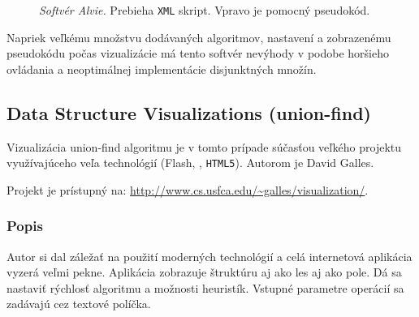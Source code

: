 \begin{figure}
\centering
{}
\caption{\emph{Softvér Alvie.} Prebieha {\tt XML} skript. Vpravo je pomocný 
pseudokód.}
\label{img:vis:alvie}
\end{figure}

Napriek veľkému množstvu dodávaných algoritmov, nastavení a 
zobrazenému pseudokódu počas vizualizácie má tento softvér nevýhody v podobe 
horšieho ovládania a neoptimálnej implementácie disjunktných množín.

\subsection{Data Structure Visualizations (union-find)}\label{sec:galles}

Vizualizácia union-find algoritmu je v tomto prípade súčasťou veľkého projektu 
využívajúceho veľa technológií (Flash, \Java, {\tt HTML5}). Autorom je David 
Galles.

Projekt je prístupný na: 
\hbox{\url{http://www.cs.usfca.edu/~galles/visualization/}}.

\subsubsection{Popis}

Autor si dal záležať na použití moderných technológií a celá internetová 
aplikácia vyzerá veľmi pekne. Aplikácia zobrazuje štruktúru aj ako les aj ako 
pole. Dá sa nastaviť rýchlosť algoritmu a možnosti heuristík. Vstupné 
parametre operácií sa zadávajú cez textové políčka.

